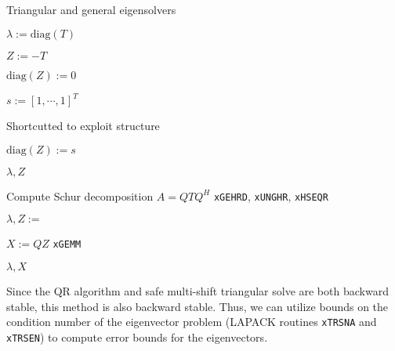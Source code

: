\documentclass{article}
\begin{document}
\begin{algorithm}[H]
  \caption{Triangular and general eigensolvers}
  \label{algorithm:eig}
  \begin{algorithmic}
    

    \State \(\lambda := \text{diag}(T)\)

    \State \(Z := -T\)

    \State \(\text{diag}(Z) := 0\)

    \State \(s := \left[1,\cdots,1\right]^T\)

    \State {}
    \Comment Shortcutted to exploit structure

    \State \(\text{diag}(Z) := s\)

    \State \Return \(\lambda, Z\)

    \EndFunction


    \State Compute Schur decomposition \(A=QTQ^H\) \Comment \texttt{xGEHRD}, \texttt{xUNGHR}, \texttt{xHSEQR}

    \State \(\lambda, Z := \) 

    \State \(X := Q Z\) \Comment \texttt{xGEMM}

    \State \Return \(\lambda, X\)

    \EndFunction

  \end{algorithmic}
\end{algorithm}
\noindent
Since the QR algorithm and safe multi-shift triangular solve are both
backward stable, this method is also backward stable. Thus, we can
utilize bounds on the condition number of the eigenvector problem
(LAPACK routines \texttt{xTRSNA} and \texttt{xTRSEN})
\cite{bai1989conditioning} to compute error bounds for the
eigenvectors.
\end{document}

